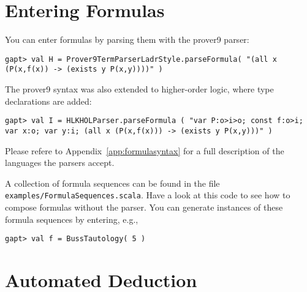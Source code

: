 \documentclass[a4paper,11pt]{article}
\newcommand{\cli}[1]{{\tt {#1}}}
\begin{document}
\section{Entering Formulas}\label{sec.entering_formulas}
You can enter formulas by parsing them with the prover9\cite{Prover9Input} parser:
%
\begin{lstlisting}
gapt> val H = Prover9TermParserLadrStyle.parseFormula( "(all x (P(x,f(x)) -> (exists y P(x,y))))" )
\end{lstlisting}
%
The prover9 syntax was also extended to higher-order logic, where type declarations are added:
%
\begin{lstlisting}
gapt> val I = HLKHOLParser.parseFormula ( "var P:o>i>o; const f:o>i; var x:o; var y:i; (all x (P(x,f(x))) -> (exists y P(x,y)))" )
\end{lstlisting}

Please refere to Appendix~\ref{app:formulasyntax} for a full description of the languages the parsers accept.

A collection of formula sequences can be found in the file \cli{examples/FormulaSequences.scala}.
Have a look at this code to see how to compose formulas without the parser.
You can generate instances of these formula sequences by entering, e.g.,
%
\begin{lstlisting}
gapt> val f = BussTautology( 5 )
\end{lstlisting}



\section{Automated Deduction}
  
\end{document}
